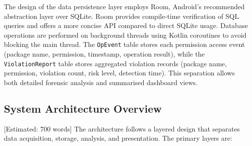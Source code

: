 The design of the data persistence layer employs Room, Android's recommended abstraction layer over SQLite. Room provides compile-time verification of SQL queries and offers a more concise API compared to direct SQLite usage. Database operations are performed on background threads using Kotlin coroutines to avoid blocking the main thread. The \texttt{OpEvent} table stores each permission access event (package name, permission, timestamp, operation result), while the \texttt{ViolationReport} table stores aggregated violation records (package name, permission, violation count, risk level, detection time). This separation allows both detailed forensic analysis and summarised dashboard views.

\subsection{System Architecture Overview} [Estimated: 700 words]
The architecture follows a layered design that separates data acquisition, storage, analysis, and presentation. The primary layers are:

